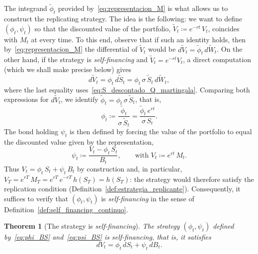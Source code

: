 \documentclass[11pt,a4paper,oneside]{report}
\theoremstyle{plain}
\newtheorem{teorema}{Theorem}[chapter]
\theoremstyle{definition}
\theoremstyle{remark}
\newcommand{\1}{\mathbf{1}}
\newcommand{\eqdef}{\coloneqq}
\begin{document}
The integrand
$\widetilde\phi_t$ provided by~\eqref{eq:representacion_M} is what
allows us to construct the replicating strategy. The idea
is the following: we want to define $(\phi_t, \psi_t)$ so that the
discounted value of the portfolio, $\widetilde V_t \eqdef e^{-rt}\, V_t$,
coincides with $M_t$ at every time. To this end, observe that if
such an identity holds, then by~\eqref{eq:representacion_M} the
differential of $\widetilde V_t$ would be
$d\widetilde V_t = \widetilde\phi_t\, d\widetilde W_t$. On the other
hand, if the strategy is \emph{self-financing} and
$\widetilde V_t = e^{-rt} V_t$, a direct computation (which we shall
make precise below) gives
\begin{equation*}
  d\widetilde V_t = \phi_t\, d\widetilde S_t
                  = \phi_t\, \sigma\, \widetilde S_t\, d\widetilde W_t,
\end{equation*}
where the last equality uses~\eqref{eq:S_descontado_Q_martingala}.
Comparing both expressions for $d\widetilde V_t$, we identify
$\widetilde\phi_t = \phi_t\, \sigma\, \widetilde S_t$, that is,
\begin{equation}\label{eq:phi_BS}
  \boxed{\;
    \phi_t \eqdef \frac{\widetilde\phi_t}{\sigma\, \widetilde S_t}
              = \frac{\widetilde\phi_t\, e^{rt}}{\sigma\, S_t}. \;}
\end{equation}
The bond holding $\psi_t$ is then defined by forcing the value of the
portfolio to equal the discounted value given by the representation,
\begin{equation}\label{eq:psi_BS}
  \boxed{\;
    \psi_t \eqdef \frac{V_t - \phi_t\, S_t}{B_t},
    \qquad \text{with } V_t \eqdef e^{rt}\, M_t. \;}
\end{equation}
Thus $V_t = \phi_t\, S_t + \psi_t\, B_t$ by construction and, in
particular,
$V_T = e^{rT}\, M_T = e^{rT}\, e^{-rT}\, h(S_T) = h(S_T)$: the
strategy would therefore satisfy the replication condition
(Definition~\ref{def:estrategia_replicante}). Consequently, it
suffices to verify that $(\phi_t, \psi_t)$ is \emph{self-financing}
in the sense of Definition~\ref{def:self_financing_continuo}.

\begin{teorema}[The strategy is \emph{self-financing}]
\label{teo:replicante_self_financing}
The strategy $(\phi_t, \psi_t)$ defined by~\eqref{eq:phi_BS}
and~\eqref{eq:psi_BS} is \emph{self-financing}, that is, it satisfies
\begin{equation*}
  dV_t = \phi_t\, dS_t + \psi_t\, dB_t.
\end{equation*}
\end{teorema}
\end{document}
